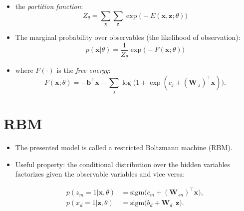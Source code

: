 \documentclass{antclass}
\begin{document}
\begin{itemize}
	\item the \textit{partition function}:
	\begin{equation}
		Z_\theta = \sum_{\mathbf{x}} \sum_{\mathbf{z}} \exp \big(-E(\mathbf{x}, \mathbf{z}; \theta)\big)
	\end{equation}
	\item The marginal probability over observables (the likelihood of observation):
	\begin{equation}
		p(\mathbf{x}|\theta) = \frac{1}{Z_\theta} \exp \big(-F(\mathbf{x}; \theta)\big)
	\end{equation}
	\item where \(F(\cdot)\) is the \emph{free energy}:
	\begin{equation}
		F(\mathbf{x}; \theta) = -\mathbf{b}^\top \mathbf{x} - \sum_j \log \big(1 + \exp(c_j + (\mathbf{W}_{\cdot j})^\top \mathbf{x}) \big).
	\end{equation}
\end{itemize}

\section{RBM}
\begin{itemize}
	\item The presented model is called a restricted Boltzmann machine (RBM).
	\item  Useful property: the conditional distribution over the hidden variables factorizes given the observable variables and vice versa:
	
	\begin{align}
		p(z_m = 1 | \mathbf{x}, \theta) &= \mathrm{sigm}\big(c_m + (\mathbf{W}_{\cdot m})^\top \mathbf{x}\big),  \\
		p(x_d = 1 | \mathbf{z}, \theta) &= \mathrm{sigm}\big(b_d + \mathbf{W}_{d \cdot} \mathbf{z}\big). 
	\end{align}
	
\end{itemize}
\end{document}
